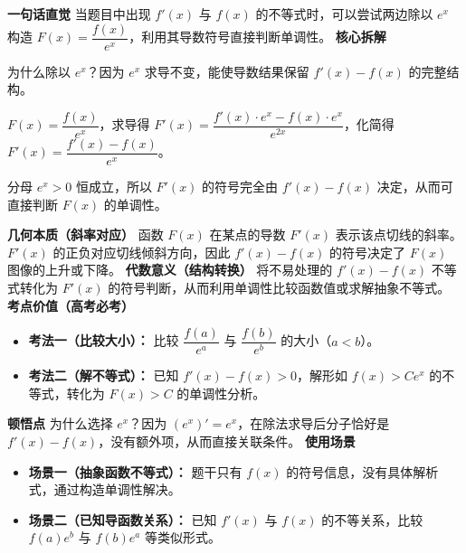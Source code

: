 \begin{explanationbox}
	\textbf{\textcolor{CExplanation}{一句话直觉}}
	当题目中出现 $f'(x)$ 与 $f(x)$ 的不等式时，可以尝试两边除以 $e^x$ 构造 $F(x)=\dfrac{f(x)}{e^x}$，利用其导数符号直接判断单调性。
	\medskip
	\textbf{\textcolor{CExplanation}{核心拆解}}
	\begin{description}[style=nextline, leftmargin=2.8em, labelsep=0.5em, itemsep=0.45em]
		\item[\textbf{要点一（构造动机）：}] 为什么除以 $e^x$？因为 $e^x$ 求导不变，能使导数结果保留 $f'(x)-f(x)$ 的完整结构。
		\item[\textbf{要点二（求导验证）：}] $F(x)=\dfrac{f(x)}{e^x}$，求导得 $F'(x)=\dfrac{f'(x)\cdot e^x - f(x)\cdot e^x}{e^{2x}}$，化简得 $F'(x)=\dfrac{f'(x)-f(x)}{e^x}$。
		\item[\textbf{要点三（符号判单调）：}] 分母 $e^x>0$ 恒成立，所以 $F'(x)$ 的符号完全由 $f'(x)-f(x)$ 决定，从而可直接判断 $F(x)$ 的单调性。
	\end{description}
	\medskip
	\textbf{\textcolor{CExplanation}{几何本质（斜率对应）}}
	函数 $F(x)$ 在某点的导数 $F'(x)$ 表示该点切线的斜率。$F'(x)$ 的正负对应切线倾斜方向，因此 $f'(x)-f(x)$ 的符号决定了 $F(x)$ 图像的上升或下降。
	\medskip
	\textbf{\textcolor{CExplanation}{代数意义（结构转换）}}
	将不易处理的 $f'(x)-f(x)$ 不等式转化为 $F'(x)$ 的符号判断，从而利用单调性比较函数值或求解抽象不等式。
	\medskip
	\textbf{\textcolor{CExplanation}{考点价值（高考必考）}}
	\begin{itemize}[leftmargin=*, itemsep=0.5em, topsep=0.4em]
		\item \textbf{考法一（比较大小）：} 比较 $\dfrac{f(a)}{e^a}$ 与 $\dfrac{f(b)}{e^b}$ 的大小（$a<b$）。
		\item \textbf{考法二（解不等式）：} 已知 $f'(x)-f(x)>0$，解形如 $f(x)>C e^x$ 的不等式，转化为 $F(x)>C$ 的单调性分析。
	\end{itemize}
	\medskip
	\textbf{\textcolor{CExplanation}{顿悟点}}
	为什么选择 $e^x$？因为 $(e^x)'=e^x$，在除法求导后分子恰好是 $f'(x)-f(x)$，没有额外项，从而直接关联条件。
	\medskip
	\textbf{\textcolor{CExplanation}{使用场景}}
	\begin{itemize}[leftmargin=*, itemsep=0.5em, topsep=0.4em]
		\item \textbf{场景一（抽象函数不等式）：} 题干只有 $f(x)$ 的符号信息，没有具体解析式，通过构造单调性解决。
		\item \textbf{场景二（已知导函数关系）：} 已知 $f'(x)$ 与 $f(x)$ 的不等关系，比较 $f(a)e^b$ 与 $f(b)e^a$ 等类似形式。
	\end{itemize}
\end{explanationbox}
